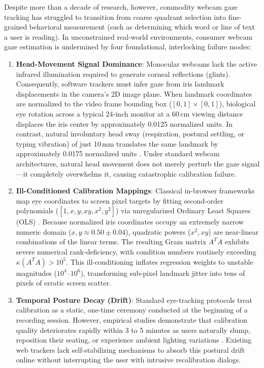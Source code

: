 \documentclass[10pt,twocolumn]{article}
\begin{document}
Despite more than a decade of research, however, commodity webcam gaze tracking has struggled to transition from coarse quadrant selection into fine-grained behavioral measurement (such as determining which word or line of text a user is reading). In unconstrained real-world environments, consumer webcam gaze estimation is undermined by four foundational, interlocking failure modes:

\begin{enumerate}[leftmargin=*]
    \item \textbf{Head-Movement Signal Dominance}: Monocular webcams lack the active infrared illumination required to generate corneal reflections (glints). Consequently, software trackers must infer gaze from iris landmark displacements in the camera's 2D image plane. When landmark coordinates are normalized to the video frame bounding box ($[0, 1] \times [0, 1]$), biological eye rotation across a typical 24-inch monitor at a 60\,cm viewing distance displaces the iris center by approximately 0.0125 normalized units. In contrast, natural involuntary head sway (respiration, postural settling, or typing vibration) of just 10\,mm translates the same landmark by approximately 0.0175 normalized units \cite{luger2020invariance}. Under standard webcam architectures, natural head movement does not merely perturb the gaze signal—it completely overwhelms it, causing catastrophic calibration failure.
    
    \item \textbf{Ill-Conditioned Calibration Mappings}: Classical in-browser frameworks map eye coordinates to screen pixel targets by fitting second-order polynomials ($[1, x, y, xy, x^2, y^2]$) via unregularized Ordinary Least Squares (OLS) \cite{papoutsaki2016webgazer,blignaut2009mapping}. Because normalized iris coordinates occupy an extremely narrow numeric domain ($x, y \approx 0.50 \pm 0.04$), quadratic powers ($x^2, xy$) are near-linear combinations of the linear terms. The resulting Gram matrix $A^T A$ exhibits severe numerical rank-deficiency, with condition numbers routinely exceeding $\kappa(A^T A) > 10^5$. This ill-conditioning inflates regression weights to unstable magnitudes ($10^4$--$10^6$), transforming sub-pixel landmark jitter into tens of pixels of erratic screen scatter.
    
    \item \textbf{Temporal Posture Decay (Drift)}: Standard eye-tracking protocols treat calibration as a static, one-time ceremony conducted at the beginning of a recording session. However, empirical studies demonstrate that calibration quality deteriorates rapidly within 3 to 5 minutes as users naturally slump, reposition their seating, or experience ambient lighting variations \cite{blignaut2014mapping}. Existing web trackers lack self-stabilizing mechanisms to absorb this postural drift online without interrupting the user with intrusive recalibration dialogs.
    

\end{enumerate}
\end{document}
